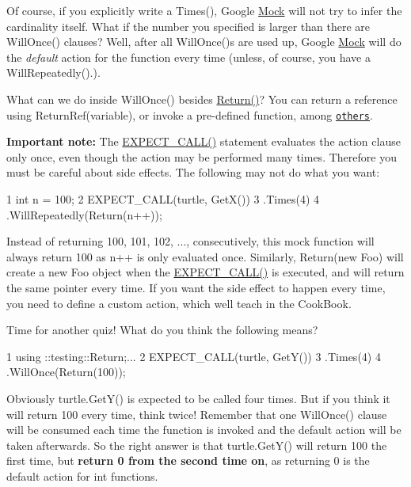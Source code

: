 Of course, if you explicitly write a {\ttfamily Times()}, Google \hyperlink{classMock}{Mock} will not try to infer the cardinality itself. What if the number you specified is larger than there are {\ttfamily Will\+Once()} clauses? Well, after all {\ttfamily Will\+Once()}s are used up, Google \hyperlink{classMock}{Mock} will do the {\itshape default} action for the function every time (unless, of course, you have a {\ttfamily Will\+Repeatedly()}.).

What can we do inside {\ttfamily Will\+Once()} besides {\ttfamily \hyperlink{namespacetesting_af6d1c13e9376c77671e37545cd84359c}{Return()}}? You can return a reference using {\ttfamily Return\+Ref(variable)}, or invoke a pre-\/defined function, among \href{http://code.google.com/p/googlemock/wiki/V1_6_CheatSheet#Actions}{\tt others}.

{\bfseries Important note\+:} The {\ttfamily \hyperlink{gmock-spec-builders_8h_a535a6156de72c1a2e25a127e38ee5232}{E\+X\+P\+E\+C\+T\+\_\+\+C\+A\+L\+L()}} statement evaluates the action clause only once, even though the action may be performed many times. Therefore you must be careful about side effects. The following may not do what you want\+:


\begin{DoxyCode}
1 int n = 100;
2 EXPECT\_CALL(turtle, GetX())
3 .Times(4)
4 .WillRepeatedly(Return(n++));
\end{DoxyCode}


Instead of returning 100, 101, 102, ..., consecutively, this mock function will always return 100 as {\ttfamily n++} is only evaluated once. Similarly, {\ttfamily Return(new Foo)} will create a new {\ttfamily Foo} object when the {\ttfamily \hyperlink{gmock-spec-builders_8h_a535a6156de72c1a2e25a127e38ee5232}{E\+X\+P\+E\+C\+T\+\_\+\+C\+A\+L\+L()}} is executed, and will return the same pointer every time. If you want the side effect to happen every time, you need to define a custom action, which we\textquotesingle{}ll teach in the Cook\+Book.

Time for another quiz! What do you think the following means?


\begin{DoxyCode}
1 using ::testing::Return;...
2 EXPECT\_CALL(turtle, GetY())
3 .Times(4)
4 .WillOnce(Return(100));
\end{DoxyCode}


Obviously {\ttfamily turtle.\+Get\+Y()} is expected to be called four times. But if you think it will return 100 every time, think twice! Remember that one {\ttfamily Will\+Once()} clause will be consumed each time the function is invoked and the default action will be taken afterwards. So the right answer is that {\ttfamily turtle.\+Get\+Y()} will return 100 the first time, but {\bfseries return 0 from the second time on}, as returning 0 is the default action for {\ttfamily int} functions.

